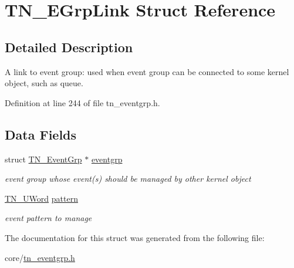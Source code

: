 \hypertarget{structTN__EGrpLink}{\section{T\+N\+\_\+\+E\+Grp\+Link Struct Reference}
\label{structTN__EGrpLink}
}


\subsection{Detailed Description}
A link to event group\+: used when event group can be connected to some kernel object, such as queue. 

Definition at line 244 of file tn\+\_\+eventgrp.\+h.

\subsection*{Data Fields}
\begin{DoxyCompactItemize}
\item 
\hypertarget{structTN__EGrpLink_a033de1028488c16a62718b2e9c8eb37f}{struct \hyperlink{structTN__EventGrp}{T\+N\+\_\+\+Event\+Grp} $\ast$ \hyperlink{structTN__EGrpLink_a033de1028488c16a62718b2e9c8eb37f}{eventgrp}}\label{structTN__EGrpLink_a033de1028488c16a62718b2e9c8eb37f}

\begin{DoxyCompactList}\small\item\em event group whose event(s) should be managed by other kernel object \end{DoxyCompactList}\item 
\hypertarget{structTN__EGrpLink_a576dde889abb0efae1f253c12a1eed64}{\hyperlink{tn__arch__example_8h_ab80cba0fe9ffcd9011d53dfeb9e39bf4}{T\+N\+\_\+\+U\+Word} \hyperlink{structTN__EGrpLink_a576dde889abb0efae1f253c12a1eed64}{pattern}}\label{structTN__EGrpLink_a576dde889abb0efae1f253c12a1eed64}

\begin{DoxyCompactList}\small\item\em event pattern to manage \end{DoxyCompactList}\end{DoxyCompactItemize}


The documentation for this struct was generated from the following file\+:\begin{DoxyCompactItemize}
\item 
core/\hyperlink{tn__eventgrp_8h}{tn\+\_\+eventgrp.\+h}\end{DoxyCompactItemize}
